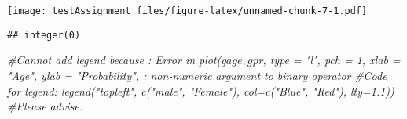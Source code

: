 \documentclass[
]{article}
\newenvironment{Shaded}{\begin{snugshade}}{\end{snugshade}}
\newcommand{\CommentTok}[1]{\textcolor[rgb]{0.56,0.35,0.01}{\textit{#1}}}
\begin{document}
\texttt{[image: testAssignment\_files/figure-latex/unnamed-chunk-7-1.pdf]}

\begin{verbatim}
## integer(0)
\end{verbatim}

\begin{Shaded}
\begin{Highlighting}[]
\CommentTok{#Cannot add legend because : Error in plot(g$age, g$pr, type = "l", pch = 1, xlab = "Age", ylab = "Probability",  : non-numeric argument to binary operator}
\CommentTok{#Code for legend: legend("topleft", c("male", "Female"), col=c("Blue", "Red"), lty=1:1))}
\CommentTok{#Please advise.}
\end{Highlighting}
\end{Shaded}
\end{document}
